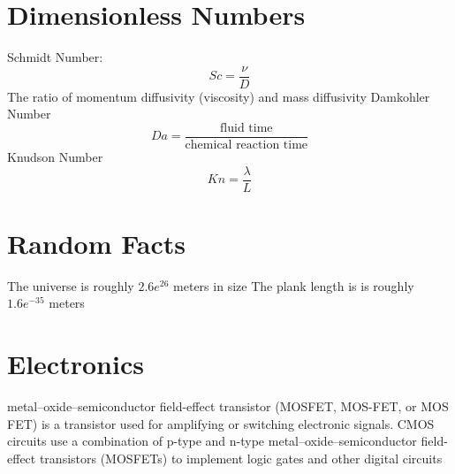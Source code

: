 \documentclass{article}
\begin{document}
%
%
\newpage
\section{Dimensionless Numbers}
Schmidt Number:
\begin{equation}
  Sc = \frac{\nu}{D}
\end{equation}
The ratio of momentum diffusivity (viscosity) and mass diffusivity
\newline
\newline
Damkohler Number
\begin{equation}
  Da = \frac{\textrm{fluid time}}{\textrm{chemical reaction time}}
\end{equation}
\newline
\newline
Knudson Number
\begin{equation}
  Kn = \frac{\lambda}{L}
\end{equation}

%
%
\newpage
\section{Random Facts}
The universe is roughly $2.6 e^{26}$ meters in size
\newline
\newline
The plank length is is roughly $1.6 e^{-35} $ meters

%
%
\newpage
\section{Electronics}

metal–oxide–semiconductor field-effect transistor (MOSFET, MOS-FET, or
MOS FET) is a transistor used for amplifying or switching electronic
signals. 
\newline
\newline
CMOS circuits use a combination of p-type and n-type
metal–oxide–semiconductor field-effect transistors (MOSFETs) to
implement logic gates and other digital circuits 



%
%
\newpage
\end{document}
